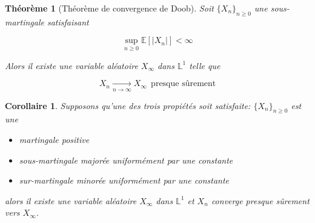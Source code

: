 \documentclass[10pt,a4paper,oneside]{article}
\newtheorem{theoreme}{Théorème}
\newtheorem{corollaire}{Corollaire}
\begin{document}
\begin{theoreme}[Théorème de convergence de Doob]
Soit $\{ X_n \}_{n \geq 0}$ une sous-martingale satisfaisant

\[ \sup_{n \geq 0} \mathbb{E}[|X_n|] < \infty \]

Alors il existe une variable aléatoire $X_\infty$ dans $\mathbb{L}^1$ telle que

\[ X_n \underset{n \to \infty}{\longrightarrow} X_\infty\ \ \text{presque sûrement} \]
\end{theoreme}

\begin{corollaire}
Supposons qu'une des trois propiétés soit satisfaite: $\{ X_n \}_{n \geq 0}$ est une

\begin{itemize}
\item
martingale positive
\item
sous-martingale majorée uniformément par une constante
\item
sur-martingale minorée uniformément par une constante
\end{itemize}

alors il existe une variable aléatoire $X_\infty$ dans $\mathbb{L}^1$ et $X_n$ converge presque sûrement vers $X_\infty$.
\end{corollaire}
\end{document}
